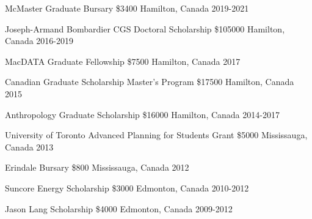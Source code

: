 \begin{cvhonors}

  \cvhonor
    {McMaster Graduate Bursary} %
    {\$3400} %
    {Hamilton, Canada} %
    {2019-2021} %
    
  \cvhonor
    {Joseph-Armand Bombardier CGS Doctoral Scholarship   } %
    {\$105000} %
    {Hamilton, Canada} %
    {2016-2019} %
    
  \cvhonor
    {MacDATA Graduate Fellowship} %
    {\$7500} %
    {Hamilton, Canada} %
    {2017} %
        
  \cvhonor
    {Canadian Graduate Scholarship Master's Program} %
    {\$17500} %
    {Hamilton, Canada} %
    {2015} %
    
  \cvhonor
    {Anthropology Graduate Scholarship} %
    {\$16000} %
    {Hamilton, Canada} %
    {2014-2017} %

  \cvhonor
    {University of Toronto Advanced Planning for Students Grant} %
    {\$5000} %
    {Mississauga, Canada} %
    {2013} %
    
    
  \cvhonor
    {Erindale Bursary} %
    {\$800} %
    {Mississauga, Canada} %
    {2012} %
    
        
  \cvhonor
    {Suncore Energy Scholarship} %
    {\$3000} %
    {Edmonton, Canada} %
    {2010-2012} %
    
            
  \cvhonor
    {Jason Lang Scholarship} %
    {\$4000} %
    {Edmonton, Canada} %
    {2009-2012} %


 
    
\end{cvhonors}